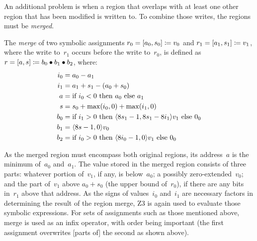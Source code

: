 An additional problem is when a region that overlaps with at least one other region
that has been modified is written to.
To combine those writes, the regions must be \emph{merged}.%
\begin{definition}
  The \emph{merge} of two symbolic assignments
  $r_0=[a_0,s_0]\coloneqq v_0$ and $r_1=[a_1,s_1]\coloneqq v_1$,
  where the write to~$r_1$ occurs before the write to~$r_0$,
  is defined as $r=[a,s]\coloneqq b_0\bullet b_1\bullet b_2$, where:
  \begin{align*}
  i_0 &= a_0 - a_1 \\
  i_1 &= a_1 + s_1 - (a_0 + s_0) \\
  a   &= \text{if } i_0 < 0 \text{ then } a_0 \text{ else } a_1 \\
  s   &= s_0 + \max(i_0, 0) + \max(i_1, 0) \\
  b_0 &= \text{if } i_1 > 0 \text{ then } \langle8 s_1-1,8 s_1 - 8 i_1\rangle v_1 \text{ else } 0_0 \\
  b_1 &= \langle8 s-1, 0\rangle v_0 \\
  b_2 &= \text{if } i_0 > 0 \text{ then } \langle8 i_0-1, 0\rangle v_1 \text{ else } 0_0
  \end{align*}
\end{definition}
As the merged region must encompass both original regions,
its address~$a$ is the minimum of~$a_0$ and~$a_1$.
The value stored in the merged region consists of three parts:
whatever portion of~$v_1$, if any, is below~$a_0$;
a possibly zero-extended~$v_0$;
and the part of~$v_1$ above $a_0+s_0$ (the upper bound of~$r_0$),
if there are any bits in~$r_1$ above that address.
As the signs of values~$i_0$ and~$i_1$ are necessary factors
in determining the result of the region merge,
Z3 is again used to evaluate those symbolic expressions.
For sets of assignments such as those mentioned above,
merge is used as an infix operator, with order being important
(the first assignment overwrites [parts of] the second as shown above).

